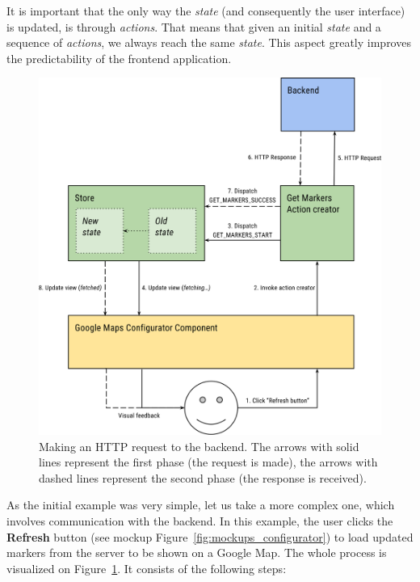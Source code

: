 It is important that the only way the \emph{state} (and consequently the user interface) is updated, is through \emph{actions}. That means that given an initial \emph{state} and a sequence of \emph{actions}, we always reach the same \emph{state}. This aspect greatly improves the predictability of the frontend application. 
\begin{figure}
	\centering
	\includegraphics[width=140mm]{img/04_frontend_making_http_request.png}
	\caption{Making an HTTP request to the backend. The arrows with solid lines represent the first phase (the request is made), the arrows with dashed lines represent the second phase (the response is received).} 
	\label{fig:frontend-making-http-request}
\end{figure}

As the initial example was very simple, let us take a more complex one, which involves communication with the backend. In this example, the user clicks the \textbf{Refresh} button (see mockup Figure~\ref{fig:mockups_configurator}) to load updated markers from the server to be shown on a Google Map. The whole process is visualized on Figure~\ref{fig:frontend-making-http-request}. It consists of the following steps:

